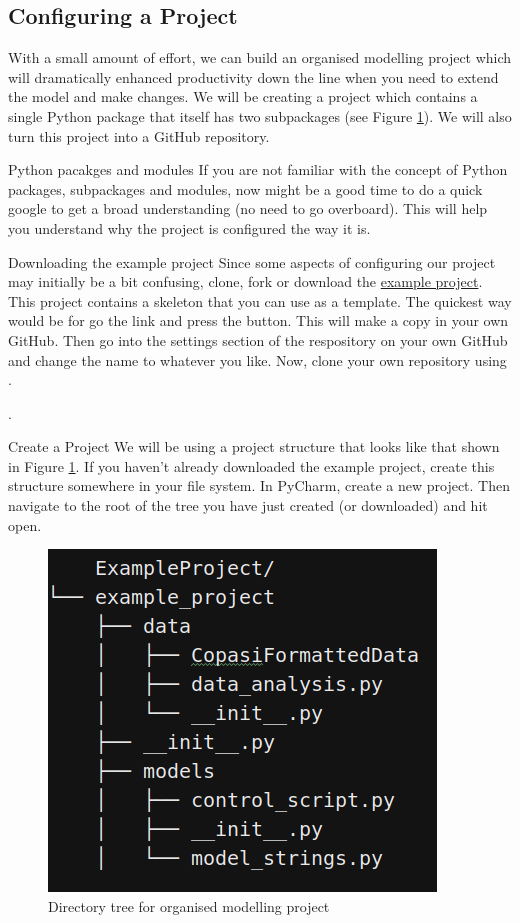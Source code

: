\documentclass[../main]{subfiles}
\begin{document}
\subsection{Configuring a Project}
With a small amount of effort, we can build an organised modelling project which will
dramatically enhanced productivity down the line when you need to extend the model and make changes.
We will be creating a project which contains a single Python package that itself has two subpackages
(see Figure \ref{fig:config:example_project}). We will also turn this project into a GitHub repository.
\begin{Task}{Python pacakges and modules}
If you are not familiar with the concept of Python packages, subpackages and modules, now might be a
good time to do a quick google to get a broad understanding  (no need to go overboard). This will
help you understand why the project is configured the way it is.
\end{Task}

\begin{Task}{Downloading the example project}
Since some aspects of configuring our project may initially be a bit confusing, clone, fork or
download the \href{https://github.com/CiaranWelsh/ExampleProject}{example project}.
This project contains a skeleton that you can use as a template.
The quickest way would be for go the link and press the  button. This will make a copy in your
own GitHub. Then go into the settings section of the respository on your own GitHub and
change the name to whatever you like. Now, clone your own repository
using .

.
\end{Task}

\begin{Task}{Create a Project}
We will be using a project structure that looks like that shown in Figure \ref{fig:config:example_project}.
If you haven't already downloaded the example project, create this structure somewhere in your file system.
In PyCharm, create a new project. Then navigate to the root of the tree you have just created (or downloaded)
and hit open.
\end{Task}

\begin{figure}[h]
\centering
\includegraphics[width=0.4\linewidth]{EnvConfig/assets/example_project_config}
\caption{Directory tree for organised modelling project}
\label{fig:config:example_project}
\end{figure}
\end{document}
